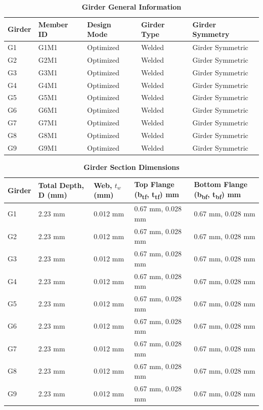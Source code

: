 \documentclass[12pt,a4paper]{report}
\numberwithin{table}{chapter}
\numberwithin{figure}{chapter}
\begin{document}
\newpage

\vspace{0.4em}
\noindent
            
\vspace{4pt}
\begin{longtable}{|L{2.2cm}|L{1.8cm}|p{3.8cm}|p{3.8cm}|p{3.8cm}|}
\caption{\textbf{Girder General Information}}
\hline
\textbf{Girder} & \textbf{Member ID} & \textbf{Design Mode} & \textbf{Girder Type} & \textbf{Girder Symmetry} \\[6pt]
\hline
G1 & G1M1 & Optimized & Welded & Girder Symmetric \\[8pt]
\hline
G2 & G2M1 & Optimized & Welded & Girder Symmetric \\[8pt]
\hline
G3 & G3M1 & Optimized & Welded & Girder Symmetric \\[8pt]
\hline
G4 & G4M1 & Optimized & Welded & Girder Symmetric \\[8pt]
\hline
G5 & G5M1 & Optimized & Welded & Girder Symmetric \\[8pt]
\hline
G6 & G6M1 & Optimized & Welded & Girder Symmetric \\[8pt]
\hline
G7 & G7M1 & Optimized & Welded & Girder Symmetric \\[8pt]
\hline
G8 & G8M1 & Optimized & Welded & Girder Symmetric \\[8pt]
\hline
G9 & G9M1 & Optimized & Welded & Girder Symmetric \\[8pt]
\hline
\end{longtable}

\vspace{0.6em}

\vspace{4pt}
\begin{longtable}{|L{1.8cm}|L{2.3cm}|L{1.8cm}|p{4.8cm}|p{4.8cm}|}
\caption{\textbf{Girder Section Dimensions}}
\hline
\textbf{Girder} & \textbf{Total Depth, D (mm)} & \textbf{Web, $t_w$ (mm)} & \textbf{Top Flange (b\textsubscript{tf}, t\textsubscript{tf}) mm} & \textbf{Bottom Flange (b\textsubscript{bf}, t\textsubscript{bf}) mm} \\[6pt]
\hline
G1 & 2.23 mm & 0.012 mm & 0.67 mm, 0.028 mm & 0.67 mm, 0.028 mm \\[8pt]
\hline
G2 & 2.23 mm & 0.012 mm & 0.67 mm, 0.028 mm & 0.67 mm, 0.028 mm \\[8pt]
\hline
G3 & 2.23 mm & 0.012 mm & 0.67 mm, 0.028 mm & 0.67 mm, 0.028 mm \\[8pt]
\hline
G4 & 2.23 mm & 0.012 mm & 0.67 mm, 0.028 mm & 0.67 mm, 0.028 mm \\[8pt]
\hline
G5 & 2.23 mm & 0.012 mm & 0.67 mm, 0.028 mm & 0.67 mm, 0.028 mm \\[8pt]
\hline
G6 & 2.23 mm & 0.012 mm & 0.67 mm, 0.028 mm & 0.67 mm, 0.028 mm \\[8pt]
\hline
G7 & 2.23 mm & 0.012 mm & 0.67 mm, 0.028 mm & 0.67 mm, 0.028 mm \\[8pt]
\hline
G8 & 2.23 mm & 0.012 mm & 0.67 mm, 0.028 mm & 0.67 mm, 0.028 mm \\[8pt]
\hline
G9 & 2.23 mm & 0.012 mm & 0.67 mm, 0.028 mm & 0.67 mm, 0.028 mm \\[8pt]
\hline

            \end{longtable}
\end{document}
